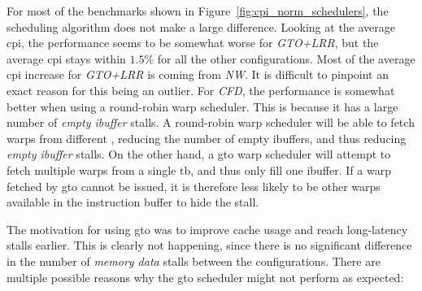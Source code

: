 For most of the benchmarks shown in Figure~\ref{fig:cpi_norm_schedulers}, the scheduling algorithm does not make a large difference. Looking at the average \acrshort{cpi}, the performance seems to be somewhat worse for \textit{GTO+LRR}, but the average \acrshort{cpi} stays within $1.5\%$ for all the other configurations. Most of the average \acrshort{cpi} increase for \textit{GTO+LRR} is coming from \textit{NW}. It is difficult to pinpoint an exact reason for this being an outlier. For \textit{CFD}, the performance is somewhat better when using a round-robin warp scheduler. This is because it has a large number of \textit{empty ibuffer} stalls. A round-robin warp scheduler will be able to fetch warps from different , reducing the number of empty ibuffers, and thus reducing \textit{empty ibuffer} stalls. On the other hand, a \acrshort{gto} warp scheduler will attempt to fetch multiple warps from a single \acrshort{tb}, and thus only fill one ibuffer. If a warp fetched by \acrshort{gto} cannot be issued, it is therefore less likely to be other warps available in the instruction buffer to hide the stall.

The motivation for using \acrshort{gto} was to improve cache usage and reach long-latency stalls earlier. This is clearly not happening, since there is no significant difference in the number of \textit{memory data} stalls between the configurations. There are multiple possible reasons why the \acrshort{gto} scheduler might not perform as expected:

